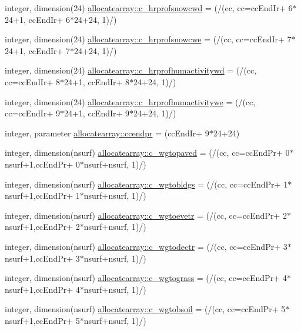 \begin{DoxyCompactItemize}
\item 
integer, dimension(24) \hyperlink{namespaceallocatearray_a5bb712bf9b293e1fe78c4c1391d770a1}{allocatearray\+::c\+\_\+hrprofsnowcwd} = (/(cc, cc=cc\+End\+Ir+ 6$\ast$24+1, cc\+End\+Ir+ 6$\ast$24+24, 1)/)
\item 
integer, dimension(24) \hyperlink{namespaceallocatearray_a16a857c23efefa766fbf96ce2b908860}{allocatearray\+::c\+\_\+hrprofsnowcwe} = (/(cc, cc=cc\+End\+Ir+ 7$\ast$24+1, cc\+End\+Ir+ 7$\ast$24+24, 1)/)
\item 
integer, dimension(24) \hyperlink{namespaceallocatearray_adf1fb00d1eea9cc75400669bc0428fae}{allocatearray\+::c\+\_\+hrprofhumactivitywd} = (/(cc, cc=cc\+End\+Ir+ 8$\ast$24+1, cc\+End\+Ir+ 8$\ast$24+24, 1)/)
\item 
integer, dimension(24) \hyperlink{namespaceallocatearray_ab556a4e4364d70401d2935d489772462}{allocatearray\+::c\+\_\+hrprofhumactivitywe} = (/(cc, cc=cc\+End\+Ir+ 9$\ast$24+1, cc\+End\+Ir+ 9$\ast$24+24, 1)/)
\item 
integer, parameter \hyperlink{namespaceallocatearray_a2186173f8e0c5718ab0b784ad2afea3c}{allocatearray\+::ccendpr} = (cc\+End\+Ir+ 9$\ast$24+24)
\item 
integer, dimension(nsurf) \hyperlink{namespaceallocatearray_a87dc79c99be72e47ace7d44501611752}{allocatearray\+::c\+\_\+wgtopaved} = (/(cc, cc=cc\+End\+Pr+ 0$\ast$nsurf+1,cc\+End\+Pr+ 0$\ast$nsurf+nsurf, 1)/)
\item 
integer, dimension(nsurf) \hyperlink{namespaceallocatearray_a24a9961978da1f3a08895f0bc9b22c74}{allocatearray\+::c\+\_\+wgtobldgs} = (/(cc, cc=cc\+End\+Pr+ 1$\ast$nsurf+1,cc\+End\+Pr+ 1$\ast$nsurf+nsurf, 1)/)
\item 
integer, dimension(nsurf) \hyperlink{namespaceallocatearray_a2f086ee120f80bc2dd2b68722d62a881}{allocatearray\+::c\+\_\+wgtoevetr} = (/(cc, cc=cc\+End\+Pr+ 2$\ast$nsurf+1,cc\+End\+Pr+ 2$\ast$nsurf+nsurf, 1)/)
\item 
integer, dimension(nsurf) \hyperlink{namespaceallocatearray_aca67856d1d3a2188f5e3c08c9524b38e}{allocatearray\+::c\+\_\+wgtodectr} = (/(cc, cc=cc\+End\+Pr+ 3$\ast$nsurf+1,cc\+End\+Pr+ 3$\ast$nsurf+nsurf, 1)/)
\item 
integer, dimension(nsurf) \hyperlink{namespaceallocatearray_a2380302825185573946e16feb348a938}{allocatearray\+::c\+\_\+wgtograss} = (/(cc, cc=cc\+End\+Pr+ 4$\ast$nsurf+1,cc\+End\+Pr+ 4$\ast$nsurf+nsurf, 1)/)
\item 
integer, dimension(nsurf) \hyperlink{namespaceallocatearray_ae0f6317a690754ae6dd059071d328cf0}{allocatearray\+::c\+\_\+wgtobsoil} = (/(cc, cc=cc\+End\+Pr+ 5$\ast$nsurf+1,cc\+End\+Pr+ 5$\ast$nsurf+nsurf, 1)/)

\end{DoxyCompactItemize}
